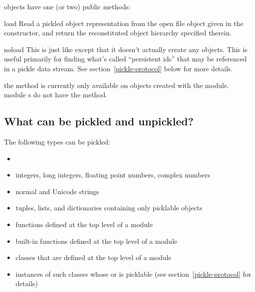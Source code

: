  objects have one (or two) public methods:

\begin{methoddesc}[Unpickler]{load}{}
Read a pickled object representation from the open file object given
in the constructor, and return the reconstituted object hierarchy
specified therein.
\end{methoddesc}

\begin{methoddesc}[Unpickler]{noload}{}
This is just like  except that it doesn't actually
create any objects.  This is useful primarily for finding what's
called ``persistent ids'' that may be referenced in a pickle data
stream.  See section~\ref{pickle-protocol} below for more details.

 the  method is currently only
available on  objects created with the
 module.   module s do
not have the  method.
\end{methoddesc}

\subsection{What can be pickled and unpickled?}

The following types can be pickled:

\begin{itemize}

\item {}

\item integers, long integers, floating point numbers, complex numbers

\item normal and Unicode strings

\item tuples, lists, and dictionaries containing only picklable objects

\item functions defined at the top level of a module

\item built-in functions defined at the top level of a module

\item classes that are defined at the top level of a module

\item instances of such classes whose  or
 is picklable  (see
section~\ref{pickle-protocol} for details)

\end{itemize}

